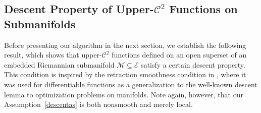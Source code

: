 \documentclass[a4paper, 12pt]{article}
\numberwithin{equation}{section}
\theoremstyle{bolddef}
\theoremstyle{definition}
\theoremstyle{boldplain}
\newcommand{\X}{\mathcal{E}}
\begin{document}
\subsection{Descent Property of Upper-$\mathcal{C}^2$ Functions on Submanifolds}\label{subsec:upperc2subm}

Before presenting our algorithm in the next section, we establish the following result, which shows that upper-$\mathcal{C}^2$ functions defined on an open superset of an embedded Riemannian submanifold $\mathcal{M} \subseteq \X$ satisfy a certain descent property. This condition is inspired by the retraction smoothness condition in \cite{Boumal2018}, where it was used for differentiable functions as a generalization to the well-known descent lemma to optimization problems on manifolds. Note again, however, that our Assumption~\ref{descentas} is both nonsmooth and merely local.
\end{document}
